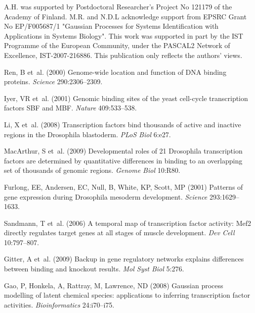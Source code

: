 \documentclass{pnastwo}
\begin{document}
\begin{article}
\begin{materials}
\end{materials}

\begin{acknowledgments}
A.H. was supported by Postdoctoral Researcher's Project No 121179 of the Academy of Finland.
M.R. and N.D.L acknowledge support from EPSRC Grant No EP/F005687/1 "Gaussian Processes for Systems Identification with Applications in Systems Biology". 
This work was supported in part by the IST Programme of the European Community, under the PASCAL2 Network of Excellence, IST-2007-216886. This publication only reflects the authors' views.
\end{acknowledgments}

%
%

\begin{thebibliography}{10}

Ren, B et~al.
\newblock (2000) Genome-wide location and function of {DNA} binding proteins.
\newblock \emph{Science} 290:2306--2309.

Iyer, VR et~al.
\newblock (2001) Genomic binding sites of the yeast cell-cycle transcription
  factors {SBF} and {MBF}.
\newblock \emph{Nature} 409:533--538.

Li, X et~al.
\newblock (2008) Transcription factors bind thousands of active and inactive
  regions in the {D}rosophila blastoderm.
\newblock \emph{PLoS Biol} 6:e27.

MacArthur, S et~al.
\newblock (2009) Developmental roles of 21 {D}rosophila transcription factors
  are determined by quantitative differences in binding to an overlapping set
  of thousands of genomic regions.
\newblock \emph{Genome Biol} 10:R80.

Furlong, EE, Andersen, EC, Null, B, White, KP, Scott, MP
\newblock (2001) Patterns of gene expression during {D}rosophila mesoderm
  development.
\newblock \emph{Science} 293:1629--1633.

Sandmann, T et~al.
\newblock (2006) A temporal map of transcription factor activity: {M}ef2
  directly regulates target genes at all stages of muscle development.
\newblock \emph{Dev Cell} 10:797--807.

Gitter, A et~al.
\newblock (2009) Backup in gene regulatory networks explains differences
  between binding and knockout results.
\newblock \emph{Mol Syst Biol} 5:276.

Gao, P, Honkela, A, Rattray, M, Lawrence, ND
\newblock (2008) Gaussian process modelling of latent chemical species:
  applications to inferring transcription factor activities.
\newblock \emph{Bioinformatics} 24:i70--i75.


\end{thebibliography}
\end{article}
\end{document}
